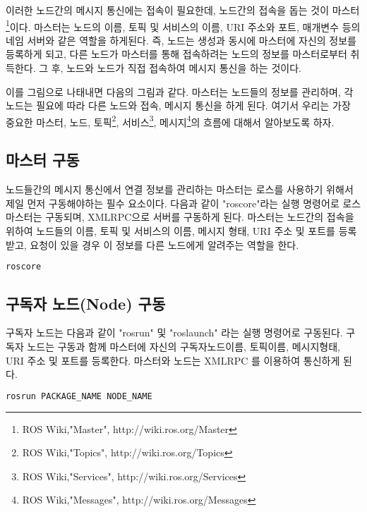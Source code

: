 이러한 노드간의 메시지 통신에는 접속이 필요한데, 노드간의 접속을 돕는 것이 마스터\footnote{ROS Wiki,"Master", http://wiki.ros.org/Master}이다. 마스터는 노드의 이름, 토픽 및 서비스의 이름, URI 주소와 포트, 매개변수 등의 네임 서버와 같은 역할을 하게된다. 즉, 노드는 생성과 동시에 마스터에 자신의 정보를 등록하게 되고, 다른 노드가 마스터를 통해 접속하려는 노드의 정보를 마스터로부터 취득한다. 그 후, 노드와 노드가 직접 접속하여 메시지 통신을 하는 것이다. 

이를 그림으로 나태내면 다음의 그림과 같다. 마스터는 노드들의 정보를 관리하며, 각 노드는 필요에 따라 다른 노드와 접속, 메시지 통신을 하게 된다. 여기서 우리는 가장 중요한 마스터, 노드, 토픽\footnote{ROS Wiki,"Topics", http://wiki.ros.org/Topics}, 서비스\footnote{ROS Wiki,"Services", http://wiki.ros.org/Services}, 메시지\footnote{ROS Wiki,"Messages", http://wiki.ros.org/Messages}의 흐름에 대해서 알아보도록 하자.

\subsection{마스터 구동}

노드들간의 메시지 통신에서 연결 정보를 관리하는 마스터는 로스를 사용하기 위해서 제일 먼저 구동해야하는 필수 요소이다. 다음과 같이 "roscore"라는 실행 명령어로 로스 마스터는 구동되며, XMLRPC으로 서버를 구동하게 된다. 마스터는 노드간의 접속을 위하여 노드들의 이름, 토픽 및 서비스의 이름, 메시지 형태, URI 주소 및 포트를  등록받고, 요청이 있을 경우 이 정보를 다른 노드에게 알려주는 역할을 한다. 

\begin{lstlisting}[language=bash]
roscore
\end{lstlisting}

\subsection{구독자 노드(Node) 구동}

구독자 노드는 다음과 같이  "rosrun" 및 "roslaunch" 라는 실행 명령어로 구동된다. 구독자 노드는 구동과 함께 마스터에 자신의 구독자노드이름, 토픽이름, 메시지형태, URI 주소 및 포트를 등록한다. 마스터와 노드는 XMLRPC 를 이용하여 통신하게 된다.

\begin{lstlisting}[language=bash]
rosrun PACKAGE_NAME NODE_NAME
\end{lstlisting}

